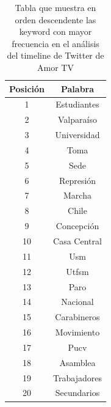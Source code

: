 \begin{table}[H]
	\begin{center}
		\begin{tabular}{| c | c |}
			\hline
			Posición & Palabra \\ \hline
			1 & Estudiantes \\ \hline
			2 & Valparaíso \\ \hline
			3 & Universidad \\ \hline
			4 & Toma \\ \hline
			5 & Sede \\ \hline
			6 & Represión \\ \hline
			7 & Marcha \\ \hline
			8 & Chile \\ \hline
			9 & Concepción \\ \hline
			10 & Casa Central \\ \hline
			11 & Usm  \\ \hline
			12 & Utfsm \\ \hline
			13 & Paro \\ \hline
			14 & Nacional \\ \hline
			15 & Carabineros \\ \hline
			16 & Movimiento \\ \hline
			17 & Pucv \\ \hline
			18 & Asamblea \\ \hline
			19 & Trabajadores \\ \hline
			20 & Secundarios \\ \hline
		\end{tabular}
		\caption{Tabla que muestra en orden descendente las keyword con mayor frecuencia
			en el análisis del timeline de Twitter de Amor TV}
		\label{tab:xyz}
	\end{center}
\end{table}


